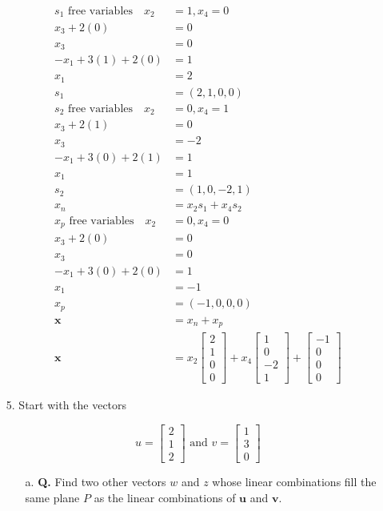 \documentclass[main.tex]{subfiles}
\begin{document}
\begin{enumerate}
$$
\begin{aligned}
s_1 \text{ free variables} \quad x_2 &= 1, x_4 = 0\\
x_3+2(0) &= 0 \\
x_3 &= 0\\
-x_1+3(1)+2(0) &= 1 \\
x_1 & = 2\\
s_1 &= (2,1,0,0)\\
s_2 \text{ free variables} \quad x_2 &= 0, x_4 = 1\\
x_3+2(1) &= 0 \\
x_3 &= -2\\
-x_1+3(0)+2(1) &= 1 \\
x_1 & = 1\\
s_2 &= (1,0,-2,1)\\
x_n & = x_2s_1 + x_4s_2 \\
x_p \text{ free variables} \quad x_2 &= 0, x_4 = 0\\
x_3+2(0) &= 0 \\
x_3 &= 0\\
-x_1+3(0)+2(0) &= 1 \\
x_1 & = -1\\
x_p &= (-1,0,0,0)\\
\bm{x} & = x_n + x_p \\
\bm{x}&=x_2\left[\begin{array}{c}
2 \\
1 \\
0 \\
0
\end{array}\right]+x_4\left[\begin{array}{c}
1 \\
0 \\
-2 \\
1
\end{array}\right]+\left[\begin{array}{c}
-1 \\
0 \\
0 \\
0
\end{array}\right]
\end{aligned}
$$

\item[5.] Start with the vectors

$$
u=\left[\begin{array}{l}
2 \\
1 \\
2
\end{array}\right] \text { and } v=\left[\begin{array}{l}
1 \\
3 \\
0
\end{array}\right]
$$
\begin{enumerate}
    \item [a.] \textbf{Q.} Find two other vectors $w$ and $z$ whose linear combinations fill the same plane $P$ as the linear combinations of $\boldsymbol{u}$ and $\boldsymbol{v}$. 
    

\end{enumerate}
\end{enumerate}
\end{document}
